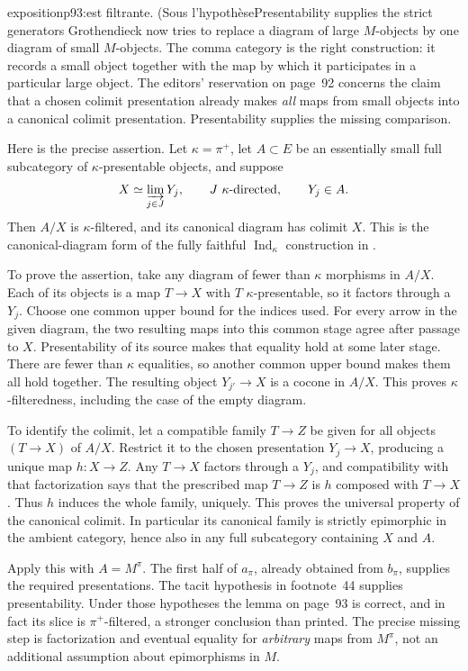\begin{dcomment}{exposition}{p93:est filtrante. (Sous l'hypothèse}{Presentability supplies the strict generators}
Grothendieck now tries to replace a diagram of large $M$-objects by one diagram of small $M$-objects. The comma category is the right construction: it records a small object together with the map by which it participates in a particular large object. The editors' reservation on page~92 concerns the claim that a chosen colimit presentation already makes \emph{all} maps from small objects into a canonical colimit presentation. Presentability supplies the missing comparison.

Here is the precise assertion. Let $\kappa=\pi^+$, let $A\subset E$ be an essentially small full subcategory of $\kappa$-presentable objects, and suppose
\[
 X\simeq\varinjlim_{j\in J}Y_j,
 \qquad J\ \kappa\text{-directed},\qquad Y_j\in A.
\]
Then $A/X$ is $\kappa$-filtered, and its canonical diagram has colimit $X$. This is the canonical-diagram form of the fully faithful $\operatorname{Ind}_\kappa$ construction in \citet[I, 9.18(a)]{SGA4I1972}.

To prove the assertion, take any diagram of fewer than $\kappa$ morphisms in $A/X$. Each of its objects is a map $T\to X$ with $T$ $\kappa$-presentable, so it factors through a $Y_j$. Choose one common upper bound for the indices used. For every arrow in the given diagram, the two resulting maps into this common stage agree after passage to $X$. Presentability of its source makes that equality hold at some later stage. There are fewer than $\kappa$ equalities, so another common upper bound makes them all hold together. The resulting object $Y_{j'}\to X$ is a cocone in $A/X$. This proves $\kappa$-filteredness, including the case of the empty diagram.

To identify the colimit, let a compatible family $T\to Z$ be given for all objects $(T\to X)$ of $A/X$. Restrict it to the chosen presentation $Y_j\to X$, producing a unique map $h:X\to Z$. Any $T\to X$ factors through a $Y_j$, and compatibility with that factorization says that the prescribed map $T\to Z$ is $h$ composed with $T\to X$. Thus $h$ induces the whole family, uniquely. This proves the universal property of the canonical colimit. In particular its canonical family is strictly epimorphic in the ambient category, hence also in any full subcategory containing $X$ and $A$.

Apply this with $A=M^\pi$. The first half of $a_\pi$, already obtained from $b_\pi$, supplies the required presentations. The tacit hypothesis in footnote~44 supplies presentability. Under those hypotheses the lemma on page~93 is correct, and in fact its slice is $\pi^+$-filtered, a stronger conclusion than printed. The precise missing step is factorization and eventual equality for \emph{arbitrary} maps from $M^\pi$, not an additional assumption about epimorphisms in $M$.


\end{dcomment}
